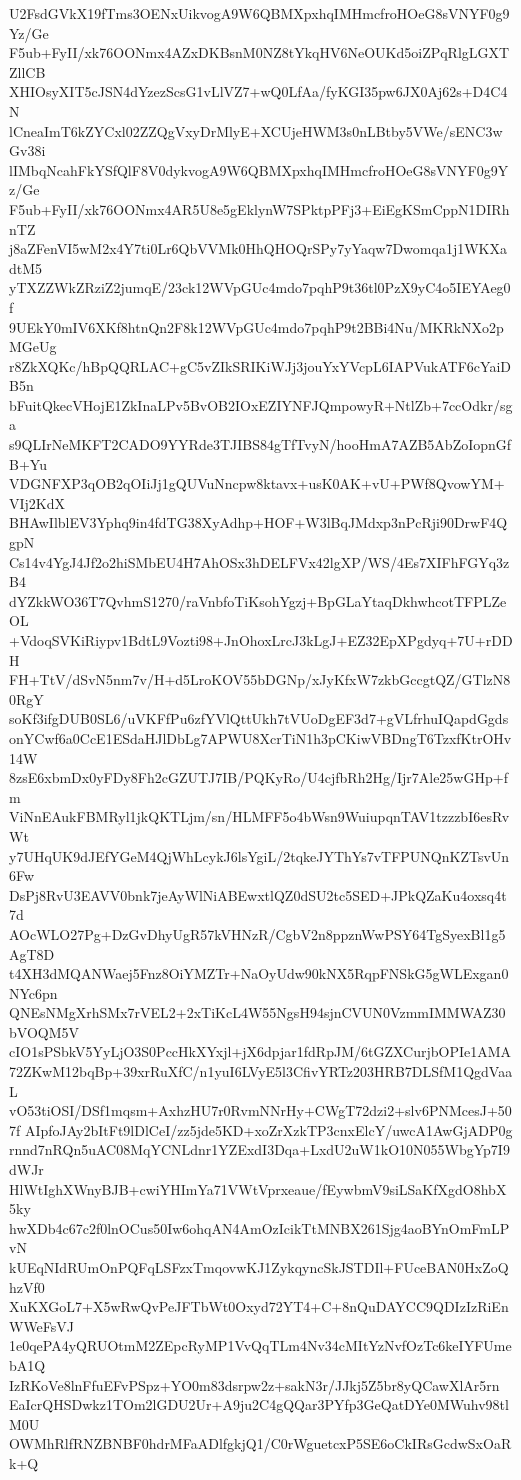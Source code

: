 U2FsdGVkX19fTms3OENxUikvogA9W6QBMXpxhqIMHmcfroHOeG8sVNYF0g9Yz/Ge
F5ub+FyII/xk76OONmx4AZxDKBsnM0NZ8tYkqHV6NeOUKd5oiZPqRlgLGXTZllCB
XHIOsyXIT5cJSN4dYzezScsG1vLlVZ7+wQ0LfAa/fyKGI35pw6JX0Aj62s+D4C4N
lCneaImT6kZYCxl02ZZQgVxyDrMlyE+XCUjeHWM3s0nLBtby5VWe/sENC3wGv38i
lIMbqNcahFkYSfQlF8V0dykvogA9W6QBMXpxhqIMHmcfroHOeG8sVNYF0g9Yz/Ge
F5ub+FyII/xk76OONmx4AR5U8e5gEklynW7SPktpPFj3+EiEgKSmCppN1DIRhnTZ
j8aZFenVI5wM2x4Y7ti0Lr6QbVVMk0HhQHOQrSPy7yYaqw7Dwomqa1j1WKXadtM5
yTXZZWkZRziZ2jumqE/23ck12WVpGUc4mdo7pqhP9t36tl0PzX9yC4o5IEYAeg0f
9UEkY0mIV6XKf8htnQn2F8k12WVpGUc4mdo7pqhP9t2BBi4Nu/MKRkNXo2pMGeUg
r8ZkXQKc/hBpQQRLAC+gC5vZIkSRIKiWJj3jouYxYVcpL6IAPVukATF6cYaiDB5n
bFuitQkecVHojE1ZkInaLPv5BvOB2IOxEZIYNFJQmpowyR+NtlZb+7ccOdkr/sga
s9QLIrNeMKFT2CADO9YYRde3TJIBS84gTfTvyN/hooHmA7AZB5AbZoIopnGfB+Yu
VDGNFXP3qOB2qOIiJj1gQUVuNncpw8ktavx+usK0AK+vU+PWf8QvowYM+VIj2KdX
BHAwIlblEV3Yphq9in4fdTG38XyAdhp+HOF+W3lBqJMdxp3nPcRji90DrwF4QgpN
Cs14v4YgJ4Jf2o2hiSMbEU4H7AhOSx3hDELFVx42lgXP/WS/4Es7XIFhFGYq3zB4
dYZkkWO36T7QvhmS1270/raVnbfoTiKsohYgzj+BpGLaYtaqDkhwhcotTFPLZeOL
+VdoqSVKiRiypv1BdtL9Vozti98+JnOhoxLrcJ3kLgJ+EZ32EpXPgdyq+7U+rDDH
FH+TtV/dSvN5nm7v/H+d5LroKOV55bDGNp/xJyKfxW7zkbGccgtQZ/GTlzN80RgY
soKf3ifgDUB0SL6/uVKFfPu6zfYVlQttUkh7tVUoDgEF3d7+gVLfrhuIQapdGgds
onYCwf6a0CcE1ESdaHJlDbLg7APWU8XcrTiN1h3pCKiwVBDngT6TzxfKtrOHv14W
8zsE6xbmDx0yFDy8Fh2cGZUTJ7IB/PQKyRo/U4cjfbRh2Hg/Ijr7Ale25wGHp+fm
ViNnEAukFBMRyl1jkQKTLjm/sn/HLMFF5o4bWsn9WuiupqnTAV1tzzzbI6esRvWt
y7UHqUK9dJEfYGeM4QjWhLcykJ6lsYgiL/2tqkeJYThYs7vTFPUNQnKZTsvUn6Fw
DsPj8RvU3EAVV0bnk7jeAyWlNiABEwxtlQZ0dSU2tc5SED+JPkQZaKu4oxsq4t7d
AOcWLO27Pg+DzGvDhyUgR57kVHNzR/CgbV2n8ppznWwPSY64TgSyexBl1g5AgT8D
t4XH3dMQANWaej5Fnz8OiYMZTr+NaOyUdw90kNX5RqpFNSkG5gWLExgan0NYc6pn
QNEsNMgXrhSMx7rVEL2+2xTiKcL4W55NgsH94sjnCVUN0VzmmIMMWAZ30bVOQM5V
cIO1sPSbkV5YyLjO3S0PccHkXYxjl+jX6dpjar1fdRpJM/6tGZXCurjbOPIe1AMA
72ZKwM12bqBp+39xrRuXfC/n1yuI6LVyE5l3CfivYRTz203HRB7DLSfM1QgdVaaL
vO53tiOSI/DSf1mqsm+AxhzHU7r0RvmNNrHy+CWgT72dzi2+slv6PNMcesJ+507f
AIpfoJAy2bItFt9lDlCeI/zz5jde5KD+xoZrXzkTP3cnxElcY/uwcA1AwGjADP0g
rnnd7nRQn5uAC08MqYCNLdnr1YZExdI3Dqa+LxdU2uW1kO10N055WbgYp7I9dWJr
HlWtIghXWnyBJB+cwiYHImYa71VWtVprxeaue/fEywbmV9siLSaKfXgdO8hbX5ky
hwXDb4c67c2f0lnOCus50Iw6ohqAN4AmOzIcikTtMNBX261Sjg4aoBYnOmFmLPvN
kUEqNIdRUmOnPQFqLSFzxTmqovwKJ1ZykqyncSkJSTDIl+FUceBAN0HxZoQhzVf0
XuKXGoL7+X5wRwQvPeJFTbWt0Oxyd72YT4+C+8nQuDAYCC9QDIzIzRiEnWWeFsVJ
1e0qePA4yQRUOtmM2ZEpcRyMP1VvQqTLm4Nv34cMItYzNvfOzTc6keIYFUmebA1Q
IzRKoVe8lnFfuEFvPSpz+YO0m83dsrpw2z+sakN3r/JJkj5Z5br8yQCawXlAr5rn
EaIcrQHSDwkz1TOm2lGDU2Ur+A9ju2C4gQQar3PYfp3GeQatDYe0MWuhv98tlM0U
OWMhRlfRNZBNBF0hdrMFaADlfgkjQ1/C0rWguetcxP5SE6oCkIRsGcdwSxOaRk+Q
